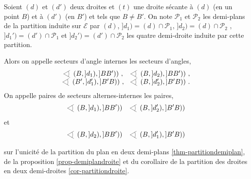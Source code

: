 \begin{defi}
Soient $(d)$ et $(d')$ deux droites et $(t)$ une droite sécante à $(d)$ (en un point $B$) et à $(d')$ (en $B'$) et tels que $B\neq B'$. On note $\mathcal{P}_1$ et $\mathcal{P}_2$ les demi-plans de la partition induite sur $\mathcal{E}$ par $(d)$, $]d_1) = (d)\cap\mathcal{P}_1$, $]d_2) = (d)\cap\mathcal{P}_2$ , $]d_1') = (d')\cap\mathcal{P}_1$ et $]d_2') = (d')\cap\mathcal{P}_2$ les quatre demi-droite induite par cette partition. 

Alors on appelle secteurs d'angle internes les secteurs d'angles,
\begin{equation*}
    \begin{array}{cc}
         \anglesaillant\left(B,]d_1),]BB')\right)\,,& \anglesaillant\left(B,]d_2),]BB')\right) \,, \\
         \anglesaillant\left(B',]d_1'),]B'B)\right)\,,& \anglesaillant\left(B,]d_2'),]B'B)\right) \,.
    \end{array}
\end{equation*}
On appelle paires de secteurs alternes-internes les paires,
\begin{equation*}
    \anglesaillant\left(B,]d_1),]BB')\right) \quad \anglesaillant\left(B,]d_2'),]B'B)\right)
\end{equation*}
et
\begin{equation*}
    \anglesaillant\left(B,]d_2),]BB')\right) \quad \anglesaillant\left(B,]d_1'),]B'B)\right)
\end{equation*}
\end{defi}
\begin{rema}
     sur l'unicité de la partition du plan en deux demi-plans \ref{thm-partitiondemiplan}, de la proposition \ref{prop-demiplandroite} et du corollaire de la partition des droites en deux demi-droites \ref{cor-partitiondroite}.
\end{rema}
